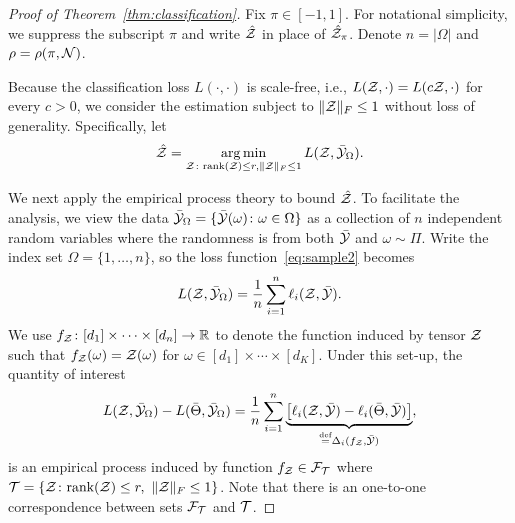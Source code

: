 \documentclass[11pt]{article}
\theoremstyle{plain}
\theoremstyle{definition}
\newcommand*{\KeepStyleUnderBrace}[1]{%
  \mathop{%
    \mathchoice
    {\underbrace{\displaystyle#1}}%
    {\underbrace{\textstyle#1}}%
    {\underbrace{\scriptstyle#1}}%
    {\underbrace{\scriptscriptstyle#1}}%
  }\limits
}
\def\rank{\textup{rank}}
\begin{document}
\begin{proof}[Proof of Theorem~\ref{thm:classification}]
Fix $\pi\in[-1,1]$. For notational simplicity, we suppress the subscript $\pi$ and write $\hat {\mathcal{Z}}$ in place of $\hat {\mathcal{Z}}_\pi$. Denote $n=|\Omega|$ and $\rho=\rho(\pi, \mathcal{N})$. 

Because the classification loss $L(\cdot, \cdot)$ is scale-free, i.e., $L(\mathcal{Z},\cdot)=L(c\mathcal{Z}, \cdot)$ for every $c>0$, we consider the estimation subject to $\lVert\mathcal{Z}\rVert_F\leq 1$ without loss of generality. Specifically, let
\[
\hat {\mathcal{Z}}=\operatorname*{arg\,min}_{\mathcal{Z}\colon \textup{rank}(\mathcal{Z})\leq r, \lVert\mathcal{Z}\rVert_F\leq 1}L(\mathcal{Z}, \bar {\mathcal{Y}}_{\Omega}).
\]

We next apply the empirical process theory to bound $\hat {\mathcal{Z}}$. To facilitate the analysis, we view the data $\bar {\mathcal{Y}}_\Omega=\{\bar {\mathcal{Y}}(\omega)\colon \omega\in \Omega\}$ as a collection of $n$ independent random variables where the randomness is from both $\bar {\mathcal{Y}}$ and $\omega\sim\Pi$. Write the index set $\Omega=\{1,\ldots,n\}$, so the loss function~\eqref{eq:sample2} becomes
\[
L(\mathcal{Z},\bar {\mathcal{Y}}_\Omega)={1\over n}\sum_{i=1}^n\ell_{i}(\mathcal{Z}, \bar {\mathcal{Y}}).
\]
We use $f_{\mathcal{Z}} \colon [d_1]\times\cdots\times[d_n] \to \mathbb{R}$ to denote the function induced by tensor $\mathcal{Z}$ such that $f_{\mathcal{Z}}(\omega)=\mathcal{Z}(\omega)$ for $\omega\in[d_1]\times \cdots \times [d_K]$. Under this set-up, the quantity of interest
\begin{align}\label{eq:empirical}
 L(\tZ,\bar \tY_\Omega)-L(\bar \Theta,\bar \tY_\Omega)={1\over n}\sum_{i=1}^n \KeepStyleUnderBrace{\left[\ell_{i}(\tZ, \bar \tY)-\ell_{i}(\bar \Theta, \bar \tY)\right]}_{\stackrel{\text{def}}{=}\Delta_i(f_\tZ,\bar \tY)},
\end{align}
is an empirical process induced by function $f_{\mathcal{Z}}\in \mathcal{F}_{\mathcal{T}}$ where $\tT=\{\tZ\colon \rank(\tZ)\leq r, \ \FnormSize{}{\tZ}\leq 1\}$. Note that there is an one-to-one correspondence between sets $\mathcal{F}_{\mathcal{T}}$ and $\mathcal{T}$. 


\end{proof}
\end{document}
